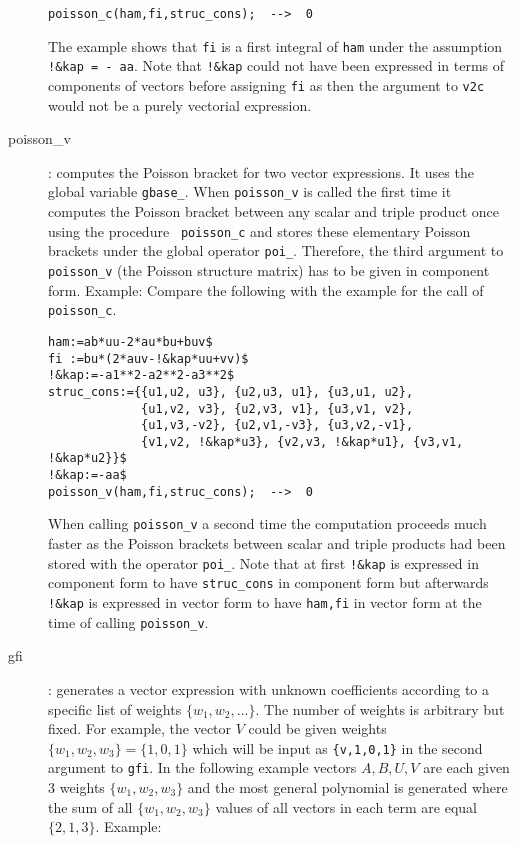 \documentclass[12pt]{article}
\begin{document}
\begin{description}
\begin{verbatim}
poisson_c(ham,fi,struc_cons);  -->  0 \end{verbatim}
The example shows that {\tt fi} is a first integral of {\tt ham} under the
assumption {\tt !\&kap = - aa}. Note that {\tt !\&kap} could not have
been expressed in terms of components of vectors before assigning {\tt fi}
as then the argument to {\tt v2c} would not be a purely vectorial expression.
  \item[poisson\_v] :
     computes the Poisson bracket for two vector expressions.  It uses
     the global variable {\tt gbase\_}. When {\tt poisson\_v} is
     called the first time it computes the Poisson bracket between any
     scalar and triple product once using the procedure {\tt
     poisson\_c} and stores these elementary Poisson brackets under
     the global operator {\tt poi\_}. Therefore, the third argument to
     {\tt poisson\_v} (the Poisson structure matrix) has to be given
     in component form. Example: Compare the following with the
     example for the call of {\tt poisson\_c}. \begin{verbatim}
ham:=ab*uu-2*au*bu+buv$
fi :=bu*(2*auv-!&kap*uu+vv)$
!&kap:=-a1**2-a2**2-a3**2$
struc_cons:={{u1,u2, u3}, {u2,u3, u1}, {u3,u1, u2},
             {u1,v2, v3}, {u2,v3, v1}, {u3,v1, v2},
             {u1,v3,-v2}, {u2,v1,-v3}, {u3,v2,-v1},
             {v1,v2, !&kap*u3}, {v2,v3, !&kap*u1}, {v3,v1, !&kap*u2}}$
!&kap:=-aa$
poisson_v(ham,fi,struc_cons);  -->  0 \end{verbatim}
     When calling {\tt poisson\_v} a second time the computation proceeds
     much faster as the Poisson brackets between scalar and triple products
     had been stored with the operator {\tt poi\_}. 
     Note that at first {\tt !\&kap}
     is expressed in component form to have {\tt struc\_cons} in component
     form but afterwards {\tt !\&kap} is expressed in vector form to have
     {\tt ham,fi} in vector form at the time of calling {\tt poisson\_v}.
  \item[gfi] : generates a vector expression with unknown coefficients
     according to a specific list of weights $\{w_1,w_2,...\}$. 
     The number of weights is arbitrary but fixed.
     For example, the vector $V$ could be given weights
     $\{w_1,w_2,w_3\}=\{1,0,1\}$ which will be input as {\tt \{v,1,0,1\}}
     in the second argument to {\tt gfi}.
     In the following example vectors $A,B,U,V$ are each given 3 weights 
     $\{w_1,w_2,w_3\}$ and the most general polynomial is generated where the
     sum of all $\{w_1,w_2,w_3\}$ values of all vectors in each term are 
     equal $\{2,1,3\}$. Example: \begin{verbatim}

\end{verbatim}
\end{description}
\end{document}
